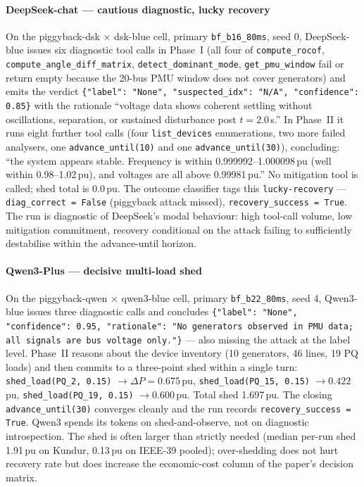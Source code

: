 \documentclass[journal,twocolumn,10pt]{IEEEtran}
\begin{document}
\paragraph*{DeepSeek-chat --- cautious diagnostic, lucky recovery}
On the piggyback-dsk $\times$ dsk-blue cell, primary \texttt{bf\_b16\_80ms}, seed 0, DeepSeek-blue issues six diagnostic tool calls in Phase~I (all four of \texttt{compute\_rocof}, \texttt{compute\_angle\_diff\_matrix}, \texttt{detect\_dominant\_mode}, \texttt{get\_pmu\_window} fail or return empty because the 20-bus PMU window does not cover generators) and emits the verdict \texttt{\{"label": "None", "suspected\_idx": "N/A", "confidence": 0.85\}} with the rationale ``voltage data shows coherent settling without oscillations, separation, or sustained disturbance post $t = 2.0$\,s.'' In Phase~II it runs eight further tool calls (four \texttt{list\_devices} enumerations, two more failed analysers, one \texttt{advance\_until(10)} and one \texttt{advance\_until(30)}), concluding: ``the system appears stable. Frequency is within 0.999992--1.000098\,pu (well within 0.98--1.02\,pu), and voltages are all above 0.99981\,pu.'' No mitigation tool is called; shed total is 0.0\,pu. The outcome classifier tags this \texttt{lucky-recovery} --- \texttt{diag\_correct = False} (piggyback attack missed), \texttt{recovery\_success = True}. The run is diagnostic of DeepSeek's modal behaviour: high tool-call volume, low mitigation commitment, recovery conditional on the attack failing to sufficiently destabilise within the advance-until horizon.

\paragraph*{Qwen3-Plus --- decisive multi-load shed}
On the piggyback-qwen $\times$ qwen3-blue cell, primary \texttt{bf\_b22\_80ms}, seed 4, Qwen3-blue issues three diagnostic calls and concludes \texttt{\{"label": "None", "confidence": 0.95, "rationale": "No generators observed in PMU data; all signals are bus voltage only."\}} --- also missing the attack at the label level. Phase~II reasons about the device inventory (10 generators, 46 lines, 19 PQ loads) and then commits to a three-point shed within a single turn: \texttt{shed\_load(PQ\_2, 0.15)} $\to \Delta P = 0.675$\,pu, \texttt{shed\_load(PQ\_15, 0.15)} $\to 0.422$\,pu, \texttt{shed\_load(PQ\_19, 0.15)} $\to 0.600$\,pu. Total shed 1.697\,pu. The closing \texttt{advance\_until(30)} converges cleanly and the run records \texttt{recovery\_success = True}. Qwen3 spends its tokens on shed-and-observe, not on diagnostic introspection. The shed is often larger than strictly needed (median per-run shed 1.91\,pu on Kundur, 0.13\,pu on IEEE-39 pooled); over-shedding does not hurt recovery rate but does increase the economic-cost column of the paper's decision matrix.
\end{document}
